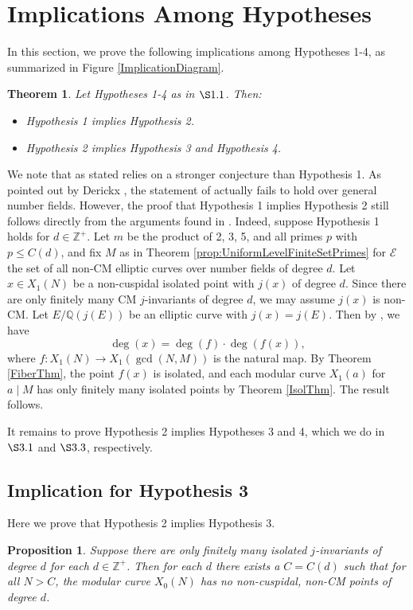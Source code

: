 \documentclass{amsart}
\newtheorem{theorem}{Theorem}
\newtheorem{proposition}{Proposition}
\theoremstyle{definition}
\newcommand{\Q}{\mathbb{Q}}
\newcommand{\Z}{\mathbb{Z}}
\begin{document}
\section{Implications Among Hypotheses}\label{Section3}
In this section, we prove the following implications among Hypotheses 1-4, as summarized in Figure \ref{ImplicationDiagram}.
\begin{theorem}\label{implication_thm} Let Hypotheses 1-4 as in $\S1.1$. Then:
   \begin{itemize}
       \item\cite[Corollary 1.7]{BELOV} Hypothesis 1 implies Hypothesis 2.
       \item Hypothesis 2 implies Hypothesis 3 and Hypothesis 4.
   \end{itemize}

\end{theorem}

We note that \cite[Corollary 1.7]{BELOV} as stated relies on a stronger conjecture than Hypothesis 1. As pointed out by Derickx \cite{DerickxPost}, the statement of \cite[Corollary 1.4]{BELOV} actually fails to hold over general number fields. However, the proof that Hypothesis 1 implies Hypothesis 2 still follows directly from the arguments found in \cite{BELOV}. Indeed, suppose Hypothesis 1 holds for $d \in \mathbb{Z}^+$. Let $m$ be the product of 2, 3, 5, and all primes $p$ with $p \leq C(d)$, and fix $M$ as in Theorem \ref{prop:UniformLevelFiniteSetPrimes} for $\mathcal{E}$ the set of all non-CM elliptic curves over number fields of degree $d$. Let $x\in X_1(N)$ be a non-cuspidal isolated point with $j(x)$ of degree $d$. Since there are only finitely many CM $j$-invariants of degree $d$, we may assume $j(x)$ is non-CM. Let $E/\Q(j(E))$ be an elliptic curve with $j(x)=j(E)$. Then by \cite[Theorem 5.1]{BELOV}, we have
\[
\deg(x)=\deg(f)\cdot \deg(f(x)),
\]
where $f:X_1(N)\rightarrow X_1(\gcd(N,M))$ is the natural map. By Theorem \ref{FiberThm}, the point $f(x)$ is isolated, and each modular curve $X_1(a)$ for $a \mid M$ has only finitely many isolated points by Theorem \ref{IsolThm}. The result follows.

It remains to prove Hypothesis 2 implies Hypotheses 3 and 4, which we do in $\S3.1$ and $\S3.3$, respectively.

\subsection{Implication for Hypothesis 3} Here we prove that Hypothesis 2 implies Hypothesis 3.
\begin{proposition}\label{Prop_Hyp2_3}
    Suppose there are only finitely many isolated $j$-invariants of degree $d$ for each $d\in \Z^+$. Then for each $d$ there exists a $C=C(d)$ such that for all $N>C$, the modular curve $X_0(N)$ has no non-cuspidal, non-CM points of degree $d$.
\end{proposition}
\end{document}
